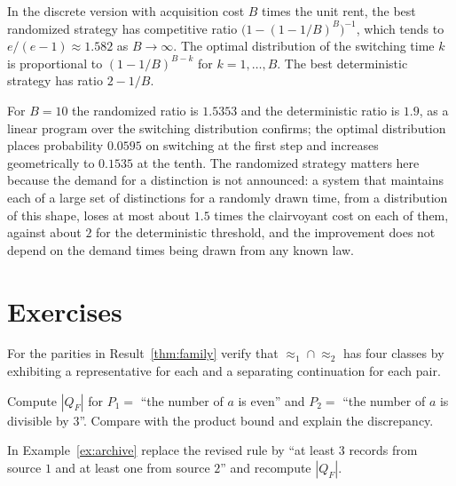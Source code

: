 \begin{established}\label{thm:rand-rent}
In the discrete version with acquisition cost $B$ times the unit rent, the best randomized strategy has competitive ratio $\bigl(1-(1-1/B)^{B}\bigr)^{-1}$, which tends to $e/(e-1)\approx1.582$ as $B\to\infty$. The optimal distribution of the switching time $k$ is proportional to $(1-1/B)^{B-k}$ for $k=1,\dots,B$. The best deterministic strategy has ratio $2-1/B$.
\end{established}

For $B=10$ the randomized ratio is $1.5353$ and the deterministic ratio is $1.9$, as a linear program over the switching distribution confirms; the optimal distribution places probability $0.0595$ on switching at the first step and increases geometrically to $0.1535$ at the tenth. The randomized strategy matters here because the demand for a distinction is not announced: a system that maintains each of a large set of distinctions for a randomly drawn time, from a distribution of this shape, loses at most about $1.5$ times the clairvoyant cost on each of them, against about $2$ for the deterministic threshold, and the improvement does not depend on the demand times being drawn from any known law.

\section*{Exercises}

\begin{exercise}
For the parities in Result~\ref{thm:family} verify that $\approx_1\cap\approx_2$ has four classes by exhibiting a representative for each and a separating continuation for each pair.
\end{exercise}

\begin{exercise}
Compute $|Q_F|$ for $P_1=$ ``the number of $a$ is even'' and $P_2=$ ``the number of $a$ is divisible by $3$''. Compare with the product bound and explain the discrepancy.
\end{exercise}

\begin{exercise}
In Example~\ref{ex:archive} replace the revised rule by ``at least $3$ records from source $1$ and at least one from source $2$'' and recompute $|Q_F|$.
\end{exercise}

